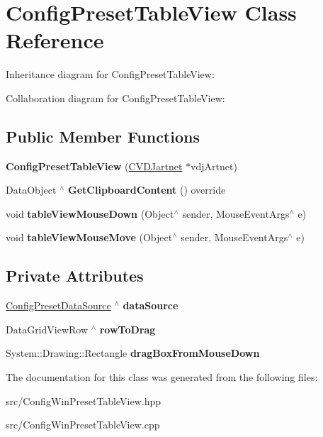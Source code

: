 \hypertarget{classConfigPresetTableView}{}\section{Config\+Preset\+Table\+View Class Reference}
\label{classConfigPresetTableView}


Inheritance diagram for Config\+Preset\+Table\+View\+:


Collaboration diagram for Config\+Preset\+Table\+View\+:
\subsection*{Public Member Functions}
\begin{DoxyCompactItemize}
\item 
\mbox{\label{classConfigPresetTableView_a68607c614e68992afca15854fad66023}} 
{\bfseries Config\+Preset\+Table\+View} (\hyperlink{classCVDJartnet}{C\+V\+D\+Jartnet} $\ast$vdj\+Artnet)
\item 
\mbox{\label{classConfigPresetTableView_a792e1aa8130b593e2a6bdff237ac293f}} 
Data\+Object $^\wedge$ {\bfseries Get\+Clipboard\+Content} () override
\item 
\mbox{\label{classConfigPresetTableView_aa36dc7fc636a5986b7e1ff2c43cf7ae3}} 
void {\bfseries table\+View\+Mouse\+Down} (Object$^\wedge$ sender, Mouse\+Event\+Args$^\wedge$ e)
\item 
\mbox{\label{classConfigPresetTableView_a20838b1a2e3b6232f0328b48d9f1a689}} 
void {\bfseries table\+View\+Mouse\+Move} (Object$^\wedge$ sender, Mouse\+Event\+Args$^\wedge$ e)
\end{DoxyCompactItemize}
\subsection*{Private Attributes}
\begin{DoxyCompactItemize}
\item 
\mbox{\label{classConfigPresetTableView_a3c8f75f000bc0ae978af651564b9ba12}} 
\hyperlink{interfaceConfigPresetDataSource}{Config\+Preset\+Data\+Source} $^\wedge$ {\bfseries data\+Source}
\item 
\mbox{\label{classConfigPresetTableView_a0082d48c24bc13e67c092a2a4a57e55e}} 
Data\+Grid\+View\+Row $^\wedge$ {\bfseries row\+To\+Drag}
\item 
\mbox{\label{classConfigPresetTableView_a27b3fbab42aafc83eebe0a27795b1f28}} 
System\+::\+Drawing\+::\+Rectangle {\bfseries drag\+Box\+From\+Mouse\+Down}
\end{DoxyCompactItemize}


The documentation for this class was generated from the following files\+:\begin{DoxyCompactItemize}
\item 
src/Config\+Win\+Preset\+Table\+View.\+hpp\item 
src/Config\+Win\+Preset\+Table\+View.\+cpp\end{DoxyCompactItemize}
